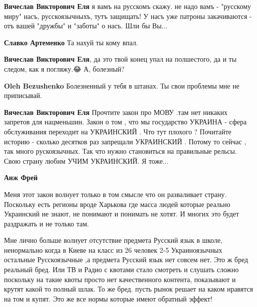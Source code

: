 \begin{itemize}
\begin{itemize}
\textbf{Вячеслав Викторович Еля} я вамъ на русскомъ скажу. не надо вамъ -
"русскому миру" насъ, русскоязычныхъ, тутъ защищать! У насъ уже патроны
закачиваются - отъ вашей "дружбы" и "заботы" о насъ. Шли бы Вы...


\textbf{Славко Артеменко} Та нахуй ты кому впал.


\textbf{Вячеслав Викторович Еля}, да это твой конец упал на полшестого, да и ты следом, как я погляжу.😂
А, болезный?🤣🤣🤣


\textbf{Oleh Bezushenko} Болезненный у тебя в штанах. Ты свои проблемы мне не приписывай.


\textbf{Вячеслав Викторович Еля} Прочтите закон про МОВУ .там нет никаких
запретов для нацменьшин. Закон о том , что мы государство УКРАИНА - сфера
обслуживания переходит на УКРАИНСКИЙ . Что тут плохого ? Почитайте историю -
сколько десятков раз запрещали УКРАИНСКИЙ . Потому то сейчас , так много
рускоязычных. Так что нужно становиться на правильные рельсы. Свою страну любим
УЧИМ УКРАИНСКИЙ. Я тоже...



\textbf{Анж Фрей} 

Меня этот закон волнует только в том смысле что он разваливает страну.
Поскольку есть регионы вроде Харькова где масса людей которые реально
Украинский не знают, не понимают и понимать не хотят. И многих это будет
раздражать и не только там. 

Мне лично больше волнует отсутствие предмета Русский язык в школе, ненормально
когда в Киеве на класс из 26 человек 2-5 Украиноязычных остальные Русскоязычные
,а предмета Русский язык нет совсем нет. Это ж бред реальный бред. Или ТВ и
Радио с квотами стало смотреть и слушать сложно поскольку на такие квоты просто
нет качественного контента, показывают и крутят какой то полный шлак. То же
бред. пусть рынок решает на каком нравятся на том и купят. Это же все нормы
которые имеют обратный эффект!


\end{itemize}
\end{itemize}
